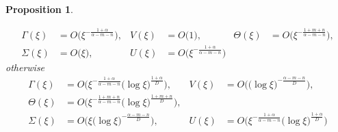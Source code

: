 \documentclass[usletter,11pt]{article}
\def\BO{{{O}}}
\newtheorem{proposition}{Proposition}[section]
\theoremstyle{remark}
\begin{document}
\begin{proposition}
\begin{enumerate}
  \begin{equation} \label{eq:ss_asymp1}
  \begin{aligned}
    \Gamma(\xi) &= \BO\big(\xi^{-\frac{1+\alpha}{\alpha-m-n}}), & V(\xi) &= \BO\big(1), &    \Theta(\xi) &= \BO\big(\xi^{-\frac{1+m+n}{\alpha-m-n}}),\\
   \Sigma(\xi) &= \BO\big(\xi), &   U(\xi) &= \BO\big(\xi^{-\frac{1+\alpha}{\alpha-m-n}})
  \end{aligned}
  \end{equation}
  otherwise
    \begin{equation} \label{eq:ss_asymp2}
  \begin{aligned}
    \Gamma(\xi) &= \BO\big(\xi^{-\frac{1+\alpha}{\alpha-m-n}}\big(\log\xi\big)^{\frac{1+\alpha}{D}}\big), & V(\xi) &= \BO\big(\big(\log\xi\big)^{-\frac{\alpha-m-n}{D}}\big),
    \\ 
        \Theta(\xi) &= \BO\big(\xi^{-\frac{1+m+n}{\alpha-m-n}}\big(\log\xi\big)^{\frac{1+m+n}{D}}\big),\\
   \Sigma(\xi) &= \BO\big(\xi\big(\log\xi\big)^{-\frac{\alpha-m-n}{D}}\big), &   U(\xi) &= \BO\big(\xi^{-\frac{1+\alpha}{\alpha-m-n}}\big(\log\xi\big)^{\frac{1+\alpha}{D}}\big)
  \end{aligned}
  \end{equation}
 \end{enumerate}
\end{proposition}
\end{document}
